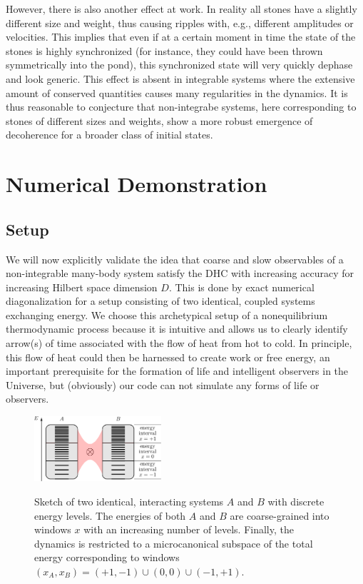 \documentclass[pre,twocolumn,10pt,aps,longbibliography,nofootinbib]{revtex4-1}
\begin{document}
However, there is also another effect at work. In reality all stones have a slightly different size and weight, thus causing ripples with, e.g., different amplitudes or velocities. This implies that even if at a certain moment in time the state of the stones is highly synchronized (for instance, they could have been thrown symmetrically into the pond), this synchronized state will very quickly dephase and look generic. This effect is absent in integrable systems where the extensive amount of conserved quantities causes many regularities in the dynamics. It is thus reasonable to conjecture that non-integrabe systems, here corresponding to stones of different sizes and weights, show a more robust emergence of decoherence for a broader class of initial states.

\section{Numerical Demonstration}
\label{sec numerics}

\subsection{Setup}

We will now explicitly validate the idea that coarse and slow observables of a non-integrable many-body system satisfy 
the DHC with increasing accuracy for increasing Hilbert space dimension $D$. This is done by exact numerical 
diagonalization for a setup consisting of two identical, coupled systems exchanging energy. We choose this
archetypical setup of a nonequilibrium thermodynamic process because it is intuitive and allows us to clearly identify
arrow(s) of time associated with the flow of heat from hot to cold. In principle, this flow of heat could then be
harnessed to create work or free energy, an important prerequisite for the formation of life and intelligent observers
in the Universe, but (obviously) our code can not simulate any forms of life or observers.

\begin{figure}[t]
 \centering\includegraphics[width=0.42\textwidth,clip=true]{sketch_setup_v2.pdf}
 \label{fig sketch setup}
 \caption{Sketch of two identical, interacting systems $A$ and $B$ with discrete energy levels. The energies of both $A$ and $B$ are coarse-grained into windows $x$ with an increasing number of levels. Finally, the dynamics is restricted to a microcanonical subspace of the total energy corresponding to windows $(x_A,x_B) = (+1,-1) \cup (0,0) \cup (-1,+1)$.}
\end{figure}
\end{document}
